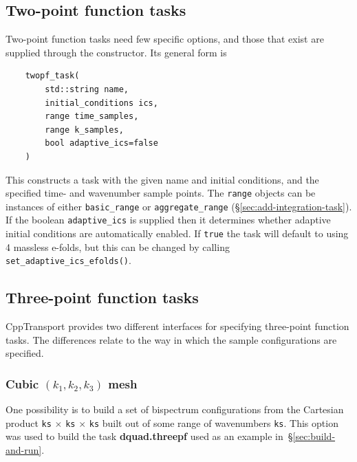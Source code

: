 \documentclass[11pt,a4paper]{article}
\newcommand{\repoobject}[1]{{\ttfamily\bfseries\small #1}}
\newcommand{\packagefont}{\sffamily}
\newcommand{\CppTransport}{{\packagefont CppTransport}}
\begin{document}
\subsection{Two-point function tasks}
\label{sec:twopf-options}
Two-point function tasks need few specific options, and those that exist are supplied
through the constructor. Its general form is
\begin{verbatim}
    twopf_task(
        std::string name,
        initial_conditions ics,
        range time_samples,
        range k_samples,
        bool adaptive_ics=false
    )
\end{verbatim}
This constructs a task with the given name and initial conditions,
and the specified time- and wavenumber sample points.
The \texttt{range} objects can be instances of either
\texttt{basic_range}
or
\texttt{aggregate_range}
(\S\ref{sec:add-integration-task}).
If the boolean
\texttt{adaptive_ics} is supplied then it determines whether adaptive initial conditions
are automatically enabled.
If \texttt{true} the task will default to using 4 massless e-folds, but this can be
changed by calling \texttt{set_adaptive_ics_efolds()}.

\subsection{Three-point function tasks}
\label{sec:threepf-options}
{\CppTransport} provides two different interfaces for
specifying three-point function tasks.
The differences relate to the way in which the sample configurations are specified.

\subsubsection{Cubic $(k_1, k_2, k_3)$ mesh}
One possibility is to build a set of bispectrum configurations from
the Cartesian product
\texttt{ks} $\times$
\texttt{ks} $\times$
\texttt{ks}
built out of some range of wavenumbers
\texttt{ks}.
This option was used to build the task
\repoobject{dquad.threepf} used as an example in~\S\ref{sec:build-and-run}.
\end{document}

